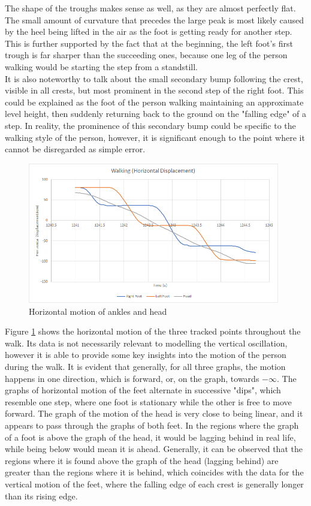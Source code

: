 \documentclass[12pt, a4paper]{article}
\begin{document}
The shape of the troughs makes sense as well, as they are almost perfectly flat.
The small amount of curvature that precedes the large peak is most likely caused
by the heel being lifted in the air as the foot is getting ready for another
step. This is further supported by the fact that at the beginning, the left
foot's first trough is far sharper than the succeeding ones, because one leg of
the person walking would be starting the step from a standstill. \\

It is also noteworthy to talk about the small secondary bump following the
crest, visible in all crests, but most prominent in the second step of the right
foot. This could be explained as the foot of the person walking maintaining an
approximate level height, then suddenly returning back to the ground on the
"falling edge" of a step. In reality, the prominence of this secondary bump
could be specific to the walking style of the person, however, it is significant
enough to the point where it cannot be disregarded as simple error.

\begin{figure}[H]
    \centering
    \includegraphics[width=11cm]{motion_horiz.png}
    \caption{Horizontal motion of ankles and head}
    \label{horiz}
\end{figure}

Figure \ref{horiz} shows the horizontal motion of the three tracked points
throughout the walk. Its data is not necessarily relevant to modelling the
vertical oscillation, however it is able to provide some key insights into the
motion of the person during the walk. It is evident that generally, for all
three graphs, the motion happens in one direction, which is forward, or, on the
graph, towards $-\infty$. The graphs of horizontal motion of the feet alternate
in successive "dips", which resemble one step, where one foot is stationary
while the other is free to move forward. The graph of the motion of the head is
very close to being linear, and it appears to pass through the graphs of both
feet. In the regions where the graph of a foot is above the graph of the head,
it would be lagging behind in real life, while being below would mean it is
ahead. Generally, it can be observed that the regions where it is found above
the graph of the head (lagging behind) are greater than the regions where it is
behind, which coincides with the data for the vertical motion of the feet, where
the falling edge of each crest is generally longer than its rising edge.
\end{document}
